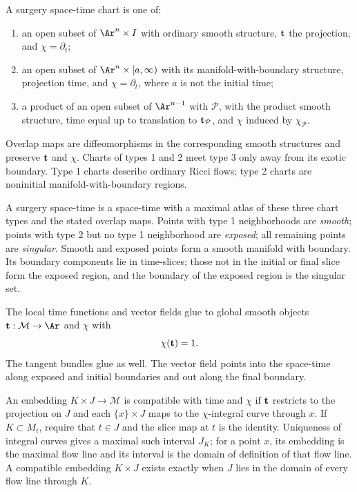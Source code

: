 A surgery space-time chart is one of:
\begin{enumerate}
\item an open subset of $\Ar^n\times I$ with ordinary smooth structure,
${\bf t}$ the projection, and $\chi=\partial_t$;
\item an open subset of $\Ar^n\times[a,\infty)$ with its manifold-with-boundary
structure, projection time, and $\chi=\partial_t$, where $a$ is not the initial
time;
\item a product of an open subset of $\Ar^{n-1}$ with ${\mathcal P}$, with the
product smooth structure, time equal up to translation to
${\bf t}_{\mathcal P}$, and $\chi$ induced by $\chi_{\mathcal P}$.
\end{enumerate}
Overlap maps are diffeomorphisms in the corresponding smooth structures and
preserve ${\bf t}$ and $\chi$. Charts of types 1 and 2 meet type 3 only away
from its exotic boundary. Type 1 charts describe ordinary Ricci flows; type 2
charts are noninitial manifold-with-boundary regions.

\begin{definition}
\label{def:surgery-space-time}
\label{spacetime}
A surgery space-time is a space-time with a maximal atlas of these three chart
types and the stated overlap maps. Points with type 1 neighborhoods are
\emph{smooth}; points with type 2 but no type 1 neighborhood are
\emph{exposed}; all remaining points are \emph{singular}. Smooth and exposed
points form a smooth manifold with boundary. Its boundary components lie in
time-slices; those not in the initial or final slice form the exposed region,
and the boundary of the exposed region is the singular set.

The local time functions and vector fields glue to global smooth objects
${\bf t}:{\mathcal M}\to\Ar$ and $\chi$ with
\[
  \chi({\bf t})=1.
\]
The tangent bundles glue as well. The vector field points into the space-time
along exposed and initial boundaries and out along the final boundary.
\end{definition}

\begin{definition}
\label{def:compatible-with-time-vector-field}
An embedding $K\times J\to{\mathcal M}$ is compatible with time and $\chi$ if
${\bf t}$ restricts to the projection on $J$ and each
$\{x\}\times J$ maps to the $\chi$-integral curve through $x$. If
$K\subset M_t$, require that $t\in J$ and the slice map at $t$ is the identity.
Uniqueness of integral curves gives a maximal such interval $J_K$; for a point
$x$, its embedding is the maximal flow line and its interval is the domain of
definition of that flow line. A compatible embedding $K\times J$ exists exactly
when $J$ lies in the domain of every flow line through $K$.
\end{definition}

